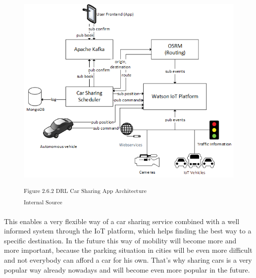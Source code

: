\begin{figure}[h]
\centering
\includegraphics[width=\textwidth/5*4]{images/car_sharing_architecture.png}

\textsuperscript{Figure 2.6.2 DRL Car Sharing App Architecture}\\
\textsuperscript{Internal Source}
\end{figure}

This enables a very flexible way of a car sharing service combined with a well informed system through the IoT platform, which helps finding the best way to a specific destination. In the future this way of mobility will become more and more important, because the parking situation in cities will be even more difficult and not everybody can afford a car for his own. That's why sharing cars is a very popular way already nowadays and will become even more popular in the future.


